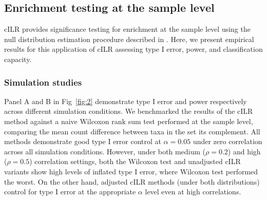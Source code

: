 \documentclass[10pt,letterpaper]{article}
\begin{document}
\subsection*{Enrichment testing at the sample level}
cILR provides significance testing for enrichment at the sample level using the null distribution estimation procedure described in . Here, we present empirical results for this application of cILR assessing type I error, power, and classification capacity. 

\subsubsection*{Simulation studies}
Panel A and B in Fig~\ref{fig:2} demonstrate type I error and power respectively across different simulation conditions. We benchmarked the results of the cILR method against a naive Wilcoxon rank sum test performed at the sample level, comparing the mean count difference between taxa in the set its complement. All methods demonstrate good type I error control at $\alpha = 0.05$ under zero correlation across all simulation conditions. However, under both medium ($\rho = 0.2$) and high ($\rho = 0.5$) correlation settings, both the Wilcoxon test and unadjusted cILR variants show high levels of inflated type I error, where Wilcoxon test performed the worst. On the other hand, adjusted cILR methods (under both distributions) control for type I error at the appropriate $\alpha$ level even at high correlations. 
\end{document}
